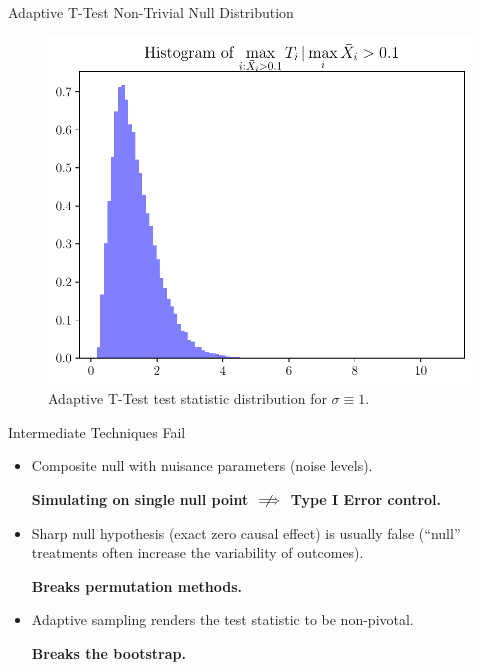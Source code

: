 \begin{frame}{Adaptive T-Test Non-Trivial Null Distribution}
\begin{figure}
    \centering
    \includegraphics[width=0.8\linewidth]{figs/introduction_att_hist.pdf}
    \caption{Adaptive T-Test test statistic distribution for $\sigma \equiv 1$.}
\end{figure}
\end{frame}

\begin{frame}{Intermediate Techniques Fail}
\begin{itemize}
    \item Composite null with nuisance parameters (noise levels).
    \begin{center}
        \textbf{Simulating on single null point $\centernot\implies$ Type I Error control.}
    \end{center}
    \item Sharp null hypothesis (exact zero causal effect) is usually false (“null” treatments often increase the variability of outcomes).
    \begin{center}
        \textbf{Breaks permutation methods.}
    \end{center}
    \item Adaptive sampling renders the test statistic to be non-pivotal.
    \begin{center}
        \textbf{Breaks the bootstrap.}
    \end{center}
\end{itemize} 
\end{frame}

